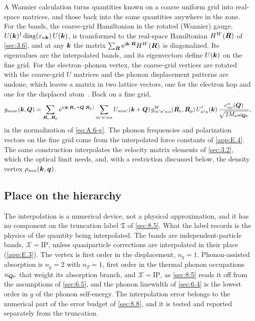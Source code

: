 A Wannier calculation turns quantities known on a coarse uniform grid into real-space matrices, and those back into the same quantities anywhere in the zone. For the bands, the coarse-grid Hamiltonian in the rotated (Wannier) gauge, $U(\bm{k})^\dagger\,\mathrm{diag}(\varepsilon_{n\bm{k}})\,U(\bm{k})$, is transformed to the real-space Hamiltonian $H^W(\bm{R})$ of \cref{sec:3.6}, and at any $\bm{k}$ the matrix $\sum_{\bm{R}}\mathrm{e}^{\mathrm{i}\bm{k}\cdot\bm{R}}H^W(\bm{R})$ is diagonalized. Its eigenvalues are the interpolated bands, and its eigenvectors define $U(\bm{k})$ on the fine grid. For the electron--phonon vertex, the coarse-grid vertices are rotated with the coarse-grid $U$ matrices and the phonon displacement patterns are undone, which leaves a matrix in two lattice vectors, one for the electron hop and one for the displaced atom~\cite[Eqs.~(177)--(179)]{giustino2017electron}. Back on a fine grid,
\begin{equation}
  g_{mn\nu}(\bm{k},\bm{Q}) = \sum_{\bm{R}_e,\bm{R}_p}\mathrm{e}^{\mathrm{i}(\bm{k}\cdot\bm{R}_e + \bm{Q}\cdot\bm{R}_p)}
  \sum_{m'n'\kappa\alpha}U_{mm'}(\bm{k}+\bm{Q})\,g^W_{m'n'\kappa\alpha}(\bm{R}_e,\bm{R}_p)\,U^\dagger_{n'n}(\bm{k})\,
  \frac{e^\alpha_{\kappa\nu}(\bm{Q})}{\sqrt{2M_\kappa\omega_{\bm{Q}\nu}}} ,
  \label{eq:E.5-ginterp}
\end{equation}
in the normalization of \cref{eq:A.6-g}. The phonon frequencies and polarization vectors on the fine grid come from the interpolated force constants of \cref{app:E.4}. The same construction interpolates the velocity matrix elements of \cref{sec:3.2}, which the optical limit needs, and, with a restriction discussed below, the density vertex $\rho_{mn}(\bm{k},\bm{q})$.

\subsection{Place on the hierarchy}

The interpolation is a numerical device, not a physical approximation, and it has no component on the truncation label $\mathfrak{T}$ of \cref{sec:8.5}. What the label records is the physics of the quantity being interpolated. The bands are independent-particle bands, $\mathcal{X} = \mathrm{IP}$, unless quasiparticle corrections are interpolated in their place (\cref{app:E.3}). The vertex is first order in the displacement, $n_g = 1$. Phonon-assisted absorption is $n_g = 2$ with $n_T = 1$, first order in the thermal phonon occupations $n_{\bm{Q}\nu}$ that weight its absorption branch, and $\mathcal{X} = \mathrm{IP}$, as \cref{sec:8.5} reads it off from the assumptions of \cref{sec:6.5}, and the phonon linewidth of \cref{sec:6.4} is the lowest order in $g$ of the phonon self-energy. The interpolation error belongs to the numerical part of the error budget of \cref{sec:8.8}, and it is tested and reported separately from the truncation.

